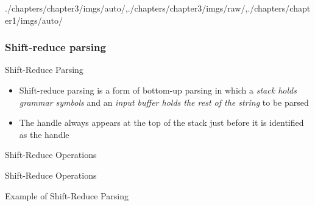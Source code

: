 \begin{graphicspathcontext}{{./chapters/chapter3/imgs/auto/},{./chapters/chapter3/imgs/raw/},{./chapters/chapter1/imgs/auto/}}
\begin{bibunit}[apalike]
\subsubsection{Shift-reduce parsing}
\subsubsectiontableofcontentslide

\begin{frame}[background=6]{Shift-Reduce Parsing}
	\begin{itemize}
		\item Shift-reduce parsing is a form of bottom-up parsing in which a \emph{stack holds grammar symbols} and an \emph{input buffer holds the rest of the string} to be parsed
		\vspace{1cm}
		\item The handle always appears at the top of the stack just before it is identified as the handle
	\end{itemize}
\end{frame}

\begin{frame}{Shift-Reduce Operations}
	\centering
	\hspace{1cm}
\end{frame}

\begin{frame}{Shift-Reduce Operations \insertcontinuationtext}
	\centering
	\hspace{1cm}
\end{frame}

\begin{frame}{Example of Shift-Reduce Parsing}
	\begin{footnotesize}
	\begin{minipage}{.33\linewidth}\begin{bnf}
		 \\
		 \\
		\bnfalt*{\bnfes} \\
		 \\
		 \\
		\bnfalt*{\bnfes} \\
		 \\
	\end{bnf}\end{minipage}
	\end{footnotesize}
	\hfill
\end{frame}


\end{bibunit}
\end{graphicspathcontext}
